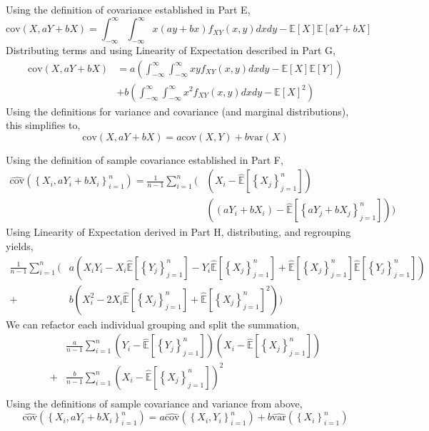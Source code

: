 \documentclass[12pt,twoside]{article}
\begin{document}
\begin{problems}
\begin{problemparts}
Using the definition of covariance established in Part E,
$$ \mathrm{cov}(X, aY + bX) = \int_{-\infty}^{\infty} \int_{-\infty}^{\infty} x (ay + bx) 
f_{XY}(x, y) dx dy - \mathbb{E}[X] \mathbb{E}[aY + bX] $$
Distributing terms and using Linearity of Expectation described in Part G,
\begin{align*}
    \mathrm{cov}(X, aY + bX) &= a \left(\int_{-\infty}^{\infty} \int_{-\infty}^{\infty} xy 
    f_{XY}(x, y) dx dy - \mathbb{E}[X]\mathbb{E}[Y]\right) \\
    &+ b \left(\int_{-\infty}^{\infty}
    \int_{-\infty}^{\infty} x^2 f_{XY}(x, y) dx dy - \mathbb{E}[X]^2 \right)
\end{align*}
Using the definitions for variance and covariance (and marginal distributions), this 
simplifies to,
$$ \boxed{\mathrm{cov}(X, aY + bX) = a \mathrm{cov}(X, Y) + b \mathrm{var}(X)} $$

\problempart %

Using the definition of sample covariance established in Part F,
\begin{align*}
    \hat{\mathrm{cov}}(\left\{X_i, aY_i + bX_i\right\}_{i = 1}^n) = \frac{1}{n - 1} 
    \sum_{i = 1}^{n} \Bigg( &\left(X_i - \hat{\mathbb{E}}\left[\left\{X_j\right\}_{j =
    1}^n\right]\right) \\
    &\left(\left(aY_i + b X_i\right) - \hat{\mathbb{E}}\left[\left\{aY_j + 
    bX_j\right\}_{j = 1}^n\right]\right)\Bigg)
\end{align*}
Using Linearity of Expectation derived in Part H, distributing, and regrouping yields,
\begin{align*}
    \frac{1}{n - 1} \sum_{i = 1}^{n} \Bigg( &a\left(X_i Y_i - X_i \hat{\mathbb{E}}\left[\left\{Y_j\right\}_{j = 1}^n  \right] - Y_i
    \hat{\mathbb{E}}\left[\left\{X_j\right\}_{j = 1}^n \right] +
    \hat{\mathbb{E}}\left[\left\{X_j\right\}_{j = 1}^n 
    \right]\hat{\mathbb{E}}\left[\left\{Y_j\right\}_{j = 1}^n  \right]\right) \\
    + &b\left(X_i^2 - 2 X_i \hat{\mathbb{E}}\left[\left\{ X_j\right\}_{j = 1}^n\right] +
    \hat{\mathbb{E}}\left[\left\{X_j\right\}_{j = 1}^n  \right]^2 \right)\Bigg)
\end{align*}
We can refactor each individual grouping and split the summation,
\begin{align*}
    &\frac{a} {n - 1} \sum_{i = 1}^n \left( Y_i - \hat{\mathbb{E}}\left[\left\{
    Y_j\right\}_{j = 1}^n  \right]\right)
    \left(X_i - \hat{\mathbb{E}}\left[\left\{X_j\right\}_{j = 1}^n \right] \right) \\ 
    + &\frac{b} {n - 1} \sum_{i = 1}^n \left(X_i - \hat{\mathbb{E}}\left[\left\{ 
    X_j\right\}_{j = 1}^n\right] \right)^2 \\
\end{align*}
Using the definitions of sample covariance and variance from above,
$$ \boxed{\hat{\mathrm{cov}}(\left\{X_i, aY_i + bX_i\right\}_{i = 1}^n) = a
\hat{\mathrm{cov}}( \left\{X_i, Y_i\right\}_{i = 1}^n) + b \hat{\mathrm{var}}
(\left\{X_i\right\}_{i = 1}^n)}  $$


\end{problemparts}
\end{problems}
\end{document}

